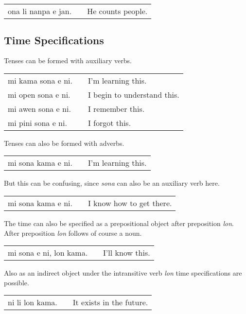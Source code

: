 \begin{supertabular}{p{5,5cm}|ll}
ona li nanpa e jan. && He counts people. \\
\end{supertabular} 
%
%
%
%
%
\subsection*{Time Specifications}
%
%
Tenses can be formed with auxiliary verbs. 

\begin{supertabular}{p{5,5cm}|ll}
mi kama sona e ni. && I'm learning this. \\
mi open sona e ni. && I begin to understand this. \\
mi awen sona e ni. && I remember this. \\
mi pini sona e ni. && I forgot this.  \\
\end{supertabular} 

Tenses can also be formed with adverbs. 

\begin{supertabular}{p{5,5cm}|ll}
mi sona kama e ni. && I'm learning this. \\
\end{supertabular} 

But this can be confusing, since \textit{sona} can also be an auxiliary verb here.

\begin{supertabular}{p{5,5cm}|ll}
mi sona kama e ni. && I know how to get there. \\
\end{supertabular} 

The time can also be specified as a prepositional object after preposition \textit{lon}. 
After preposition \textit{lon} follows of course a noun. 

\begin{supertabular}{p{5,5cm}|ll}
mi sona e ni, lon kama. && I'll know this. \\
\end{supertabular} 

Also as an indirect object under the intransitive verb \textit{lon} time specifications are possible.

\begin{supertabular}{p{5,5cm}|ll}
ni li lon kama. && It exists in the future. \\
\end{supertabular} 

